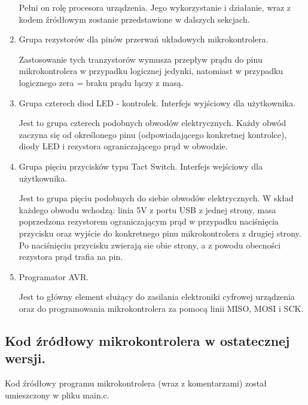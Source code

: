 \documentclass[a4paper,oneside,11pt]{report}
\begin{document}
\begin{enumerate}[1.]
Pełni on rolę procesora urządzenia. Jego wykorzystanie i działanie, wraz z kodem źródłowym zostanie przedstawione w dalszych sekcjach.

\item Grupa rezystorów dla pinów przerwań układowych mikrokontrolera.

Zastosowanie tych tranzystorów wymusza przepływ prądu do pinu mikrokontrolera w przypadku logicznej jedynki, natomiast w przypadku logicznego zera = braku prądu łączy z masą.

\item Grupa czterech diod LED - kontrolek. Interfejs wyjściowy dla użytkownika.

Jest to grupa czterech podobnych obwodów elektrycznych. Każdy obwód zaczyna się od określonego pinu (odpowiadającego konkretnej kontrolce), diody LED i rezystora ograniczającego prąd w obwodzie.

\item Grupa pięciu przycisków typu Tact Switch. Interfejs wejściowy dla użytkownika.

Jest to grupa pięciu podobnych do siebie obwodów elektrycznych. W skład każdego obwodu wchodzą: linia 5V z portu USB z jednej strony, masa poprzedzona rezystorem ograniczającym prąd w przypadku naciśnięcia przycisku oraz wyjście do konkretnego pinu mikrokontrolera z drugiej strony. Po naciśnięciu przycisku zwierają sie obie strony, a z powodu obecności rezystora prąd trafia na pin.

\item Programator AVR.

Jest to główny element służący do zasilania elektroniki cyfrowej urządzenia oraz do programowania mikrokontrolera za pomocą linii MISO, MOSI i SCK.
\end{enumerate}
\subsection{Kod źródłowy mikrokontrolera w ostatecznej wersji.}
Kod źródłowy programu mikrokontrolera (wraz z komentarzami) został umieszczony w pliku main.c.
\end{document}
